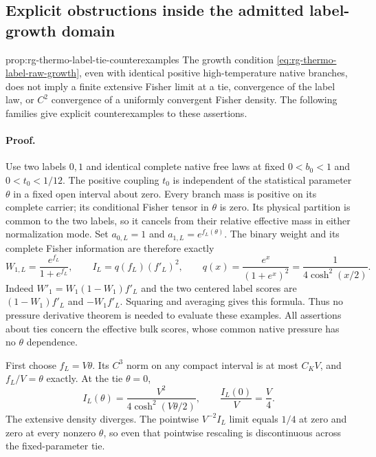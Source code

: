 \subsection{Explicit obstructions inside the admitted label-growth domain}
\label{sec:rg-thermo-label-counterexamples}

{prop:rg-thermo-label-tie-counterexamples}
The growth condition \cref{eq:rg-thermo-label-raw-growth}, even with
identical positive high-temperature native branches, does not imply a
finite extensive Fisher limit at a tie, convergence of the label law,
or $C^2$ convergence of a uniformly convergent Fisher density. The
following families give explicit counterexamples to these assertions.\thermoestablishedstatus


\paragraph{Proof.}
Use two labels $0,1$ and identical complete native free laws at fixed
$0<b_0<1$ and $0<t_0<1/12$. The positive coupling $t_0$ is independent
of the statistical parameter $\theta$ in a fixed open interval about
zero. Every branch mass is positive on its complete carrier; its
conditional Fisher tensor in $\theta$ is zero. Its physical partition
is common to the two labels, so it cancels from their relative effective
mass in either normalization mode. Set $a_{0,L}=1$ and
$a_{1,L}=e^{f_L(\theta)}$. The binary weight and its complete Fisher
information are therefore exactly
\begin{equation}
 W_{1,L}=\frac{e^{f_L}}{1+e^{f_L}},\qquad
 I_L=q(f_L)(f'_L)^2,\qquad
 q(x)=\frac{e^x}{(1+e^x)^2}=\frac1{4\cosh^2(x/2)}.
 \label{eq:rg-thermo-label-binary-formula}
\end{equation}
Indeed $W'_1=W_1(1-W_1)f'_L$ and the two centered label scores are
$(1-W_1)f'_L$ and $-W_1f'_L$. Squaring and averaging gives this
formula. Thus no pressure derivative theorem is needed to evaluate
these examples. All assertions about ties concern the effective bulk
scores, whose common native pressure has no $\theta$ dependence.

First choose $f_L=V\theta$. Its $C^3$ norm on any compact interval is
at most $C_KV$, and $f_L/V=\theta$ exactly. At the tie $\theta=0$,
\begin{equation}
 I_L(\theta)=\frac{V^2}{4\cosh^2(V\theta/2)},\qquad
 \frac{I_L(0)}V=\frac V4.
 \label{eq:rg-thermo-label-linear-tie-example}
\end{equation}
The extensive density diverges. The pointwise $V^{-2}I_L$ limit equals
$1/4$ at zero and zero at every nonzero $\theta$, so even that pointwise
rescaling is discontinuous across the fixed-parameter tie.


